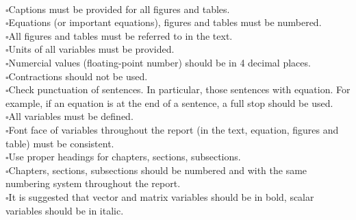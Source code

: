 \\$\square${Captions must be provided for all figures and tables.}
\\$\square${Equations (or important equations), figures and tables must be numbered.}
\\$\square${All figures and tables must be referred to in the text.}
\\$\square${Units of all variables must be provided.}
\\$\square${Numercial values (floating-point number) should be in 4 decimal places.}
\\$\square${Contractions should not be used.}
\\$\square${Check punctuation of sentences.  In particular, those sentences with equation.  For example, if an equation is at the end of a sentence, a full stop should be used.}
\\$\square${All variables must be defined.}
\\$\square${Font face of variables throughout the report (in the text, equation, figures and table) must be consistent.}
\\$\square${Use proper headings for chapters, sections, subsections.}
\\$\square${Chapters, sections, subsections should be numbered and with the same numbering system throughout the report.}
\\$\square${It is suggested that vector and matrix variables should be in bold, scalar variables should be in italic.}
